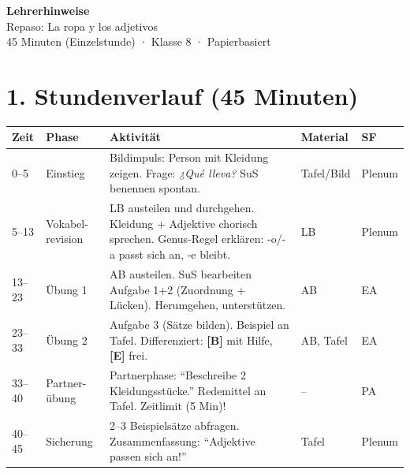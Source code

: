 \documentclass[11pt, a4paper]{article}
\newcommand{\basis}{\textcolor{basisgreen}{\textbf{[B]}}}
\newcommand{\erweiterung}{\textcolor{erweiterungpurple}{\textbf{[E]}}}
\begin{document}

\begin{center}
    {\LARGE\bfseries\textcolor{spanisch}{Lehrerhinweise}}\\[4pt]
    {\large Repaso: La ropa y los adjetivos}\\[2pt]
    {\normalsize 45 Minuten (Einzelstunde) · Klasse 8 · Papierbasiert}
\end{center}

\vspace{8pt}


\section*{1. Stundenverlauf (45 Minuten)}

\begin{longtable}{|p{1.2cm}|p{2cm}|p{6cm}|p{2.5cm}|p{2cm}|}
\hline
\textbf{Zeit} & \textbf{Phase} & \textbf{Aktivität} & \textbf{Material} & \textbf{SF} \\
\hline
\endhead

0--5 & Einstieg &
Bildimpuls: Person mit Kleidung zeigen. Frage: \textit{¿Qué lleva?} SuS benennen spontan. &
Tafel/Bild &
Plenum \\
\hline

5--13 & Vokabel-revision &
LB austeilen und durchgehen. Kleidung + Adjektive chorisch sprechen. Genus-Regel erklären: -o/-a passt sich an, -e bleibt. &
LB &
Plenum \\
\hline

13--23 & Übung 1 &
AB austeilen. SuS bearbeiten Aufgabe 1+2 (Zuordnung + Lücken). Herumgehen, unterstützen. &
AB &
EA \\
\hline

23--33 & Übung 2 &
Aufgabe 3 (Sätze bilden). Beispiel an Tafel. Differenziert: \basis{} mit Hilfe, \erweiterung{} frei. &
AB, Tafel &
EA \\
\hline

33--40 & Partner-übung &
Partnerphase: ``Beschreibe 2 Kleidungsstücke.'' Redemittel an Tafel. Zeitlimit (5 Min)! &
-- &
PA \\
\hline

40--45 & Sicherung &
2--3 Beispielsätze abfragen. Zusammenfassung: ``Adjektive passen sich an!'' &
Tafel &
Plenum \\
\hline
\end{longtable}
\end{document}
